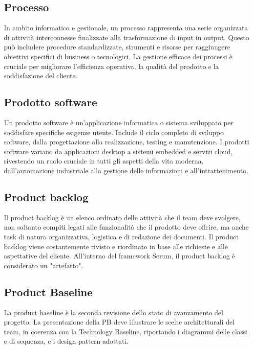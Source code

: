 \subsection*{Processo}
\par In ambito informatico e gestionale, un processo rappresenta una serie organizzata di attività interconnesse finalizzate alla trasformazione di input in output. Questo può includere procedure standardizzate, strumenti e risorse per raggiungere obiettivi specifici di business o tecnologici. La gestione efficace dei processi è cruciale per migliorare l'efficienza operativa, la qualità del prodotto e la soddisfazione del cliente.

\vspace{2em}
\subsection*{Prodotto software}
\par Un prodotto software è un'applicazione informatica o sistema sviluppato per soddisfare specifiche esigenze utente. Include il ciclo completo di sviluppo software, dalla progettazione alla realizzazione, testing e manutenzione. I prodotti software variano da applicazioni desktop a sistemi embedded e servizi cloud, rivestendo un ruolo cruciale in tutti gli aspetti della vita moderna, dall'automazione industriale alla gestione delle informazioni e all'intrattenimento.

\vspace{2em}
\subsection*{Product backlog}
\par Il product backlog è un elenco ordinato delle attività che il team deve svolgere, non soltanto compiti legati alle funzionalità che il prodotto deve offrire, ma anche task di natura organizzativa, logistica e di redazione dei documenti. Il product backlog viene costantemente rivisto e riordinato in base alle richieste e alle aspettative del cliente. All’interno del framework Scrum, il product backlog è considerato un "artefatto".

\vspace{2em}
\subsection*{Product Baseline}
\par La product baseline è la seconda revisione dello stato di avanzamento del progetto. La presentazione della PB deve illustrare le scelte architetturali del team, in coerenza con la Technology Baseline, riportando i diagrammi delle classi e di sequenza, e i design pattern adottati.

